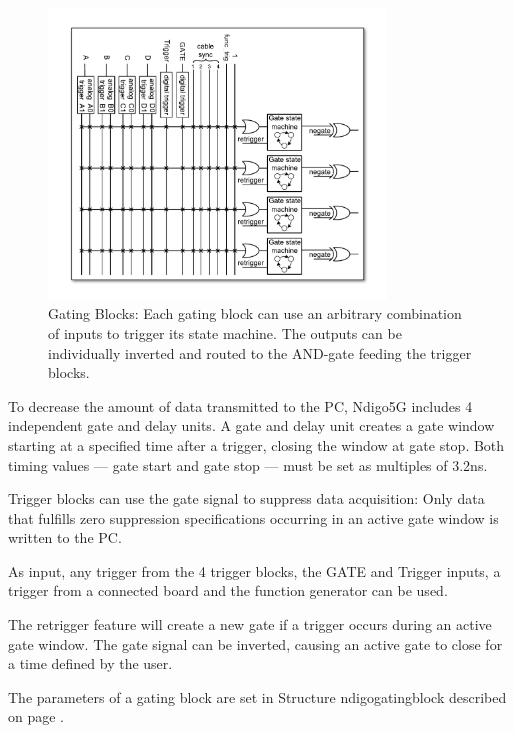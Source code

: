 		\begin{figure}[ht]
			\begin{center}
				\includegraphics[width=0.8\textwidth]{figures/GatingBlocks.pdf}
				\caption{\label{fig:GatingBlock} Gating Blocks: Each gating block can use an arbitrary combination of inputs to trigger its state machine. The outputs can be individually inverted and routed to the AND-gate feeding the trigger blocks.}
			\end{center}
		\end{figure}
		
		To decrease the amount of data transmitted to the PC, Ndigo5G includes 4 independent gate and delay units. A gate and delay unit creates a gate window starting at a specified time after a trigger, closing the window at gate stop. Both timing values — gate start and gate stop — must be set as 
multiples of 3.2ns.\par

		Trigger blocks can use the gate signal to suppress data acquisition: Only data that fulfills zero suppression specifications occurring in an active gate window is written to the PC.\par
		As input, any trigger from the 4 trigger blocks, the GATE and Trigger inputs, a trigger from a connected board and the function generator can be used.\par
		
		The retrigger feature will create a new gate if a trigger occurs during an active gate window. The gate signal can be inverted, causing an active gate to close for a time defined by the user.\par
		
		The parameters of a gating block are set in Structure \textsf{ndigo\tu gating\tu block} described on page \pageref{cp:gatingblock}.\par
		
